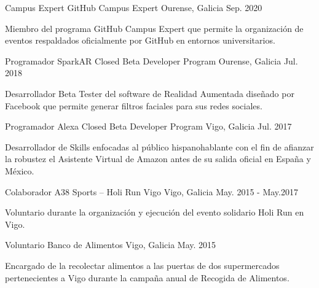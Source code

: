 \documentclass[11pt, a4paper]{style}
\begin{document}
\begin{cventries}
    \vspace{0.1cm}
  \cventry
    {Campus Expert} %
    {GitHub Campus Expert} %
    {Ourense, Galicia} %
    {Sep. 2020} %
    {
      \begin{cvitems} %
        \item {Miembro del programa GitHub Campus Expert que permite la organización de eventos respaldados oficialmente por GitHub en entornos universitarios.}
      \end{cvitems}
    }
    \vspace{0.1cm}
  \cventry
    {Programador} %
    {SparkAR Closed Beta Developer Program} %
    {Ourense, Galicia} %
    {Jul. 2018} %
    {
      \begin{cvitems} %
        \item {Desarrollador Beta Tester del software de Realidad Aumentada diseñado por Facebook que permite generar filtros faciales para sus redes sociales.}
      \end{cvitems}
    }
    \vspace{0.1cm}
  \cventry
    {Programador} %
    {Alexa Closed Beta Developer Program} %
    {Vigo, Galicia} %
    {Jul. 2017} %
    {
      \begin{cvitems} %
        \item {Desarrollador de Skills enfocadas al público hispanohablante con el fin de afianzar la robustez el Asistente Virtual de Amazon antes de su salida oficial en España y México.}
      \end{cvitems}
    }
    \vspace{0.1cm}
  \cventry
    {Colaborador} %
    {A38 Sports – Holi Run Vigo} %
    {Vigo, Galicia} %
    {May. 2015 - May.2017} %
    {
      \begin{cvitems} %
        \item {Voluntario durante la organización y ejecución del evento solidario Holi Run en Vigo.}
      \end{cvitems}
    }
    \vspace{0.1cm}
  \cventry
    {Voluntario} %
    {Banco de Alimentos} %
    {Vigo, Galicia} %
    {May. 2015} %
    {
      \begin{cvitems} %
        \item {Encargado de la recolectar alimentos a las puertas de dos supermercados pertenecientes a Vigo durante la campaña anual de Recogida de Alimentos.}
      \end{cvitems}
    }
\end{cventries}
\end{document}
